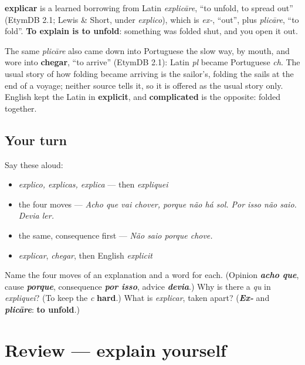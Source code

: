 \begin{cousinweb}
\textbf{explicar} is a learned borrowing from Latin \emph{explicāre}, \textquotedblleft{}to unfold, to spread out\textquotedblright{} (EtymDB 2.1; Lewis \& Short, under \emph{explico}), which is \emph{ex-}, \textquotedblleft{}out\textquotedblright{}, plus \emph{plicāre}, \textquotedblleft{}to fold\textquotedblright{}. \textbf{To explain is to unfold}: something was folded shut, and you open it out.

The same \emph{plicāre} also came down into Portuguese the slow way, by mouth, and wore into \textbf{chegar}, \textquotedblleft{}to arrive\textquotedblright{} (EtymDB 2.1): Latin \emph{pl} became Portuguese \emph{ch}. The usual story of how folding became arriving is the sailor's, folding the sails at the end of a voyage; neither source tells it, so it is offered as the usual story only. English kept the Latin in \textbf{explicit}, and \textbf{complicated} is the opposite: folded together.
\end{cousinweb}

\subsection*{Your turn}
Say these aloud:

\begin{itemize}
\raggedright
  \item \emph{explico, explicas, explica} — then \emph{expliquei}
  \item the four moves — \emph{Acho que vai chover, porque não há sol. Por isso não saio. Devia ler.}
  \item the same, consequence first — \emph{Não saio porque chove.}
  \item \emph{explicar}, \emph{chegar}, then English \emph{explicit}
\end{itemize}

\begin{tcolorbox}[breakable,colback=teal!4,colframe=teal!35!black,title={Before you move on}]
Name the four moves of an explanation and a word for each. (Opinion \emph{\textbf{acho que}}, cause \emph{\textbf{porque}}, consequence \emph{\textbf{por isso}}, advice \emph{\textbf{devia}}.) Why is there a \emph{qu} in \emph{expliquei}? (To keep the \emph{c} \textbf{hard}.) What is \emph{explicar}, taken apart? (\emph{\textbf{Ex-}} and \emph{\textbf{plicāre}}: \textbf{to unfold}.)
\end{tcolorbox}
\section[(review)]{Review — explain yourself}

